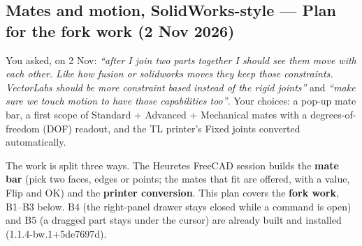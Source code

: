 \subsection{Mates and motion, SolidWorks-style --- Plan for the fork work (2 Nov 2026)}\label{sec:mates-motion-plan}

You asked, on 2 Nov: \emph{``after I join two parts together I should see them move with each other. Like how
fusion or solidworks moves they keep those constraints. VectorLabs should be more constraint based instead of the
rigid joints''} and \emph{``make sure we touch motion to have those capabilities too''}. Your choices: a pop-up
mate bar, a first scope of Standard + Advanced + Mechanical mates with a degrees-of-freedom (DOF) readout, and the
TL printer's Fixed joints converted automatically.

The work is split three ways. The Heuretes FreeCAD session builds the \textbf{mate bar} (pick two faces, edges or
points; the mates that fit are offered, with a value, Flip and OK) and the \textbf{printer conversion}. This plan
covers the \textbf{fork work}, B1--B3 below. B4 (the right-panel drawer stays closed while a command is open) and
B5 (a dragged part stays under the cursor) are already built and installed (1.1.4-bw.1+5de7697d).

